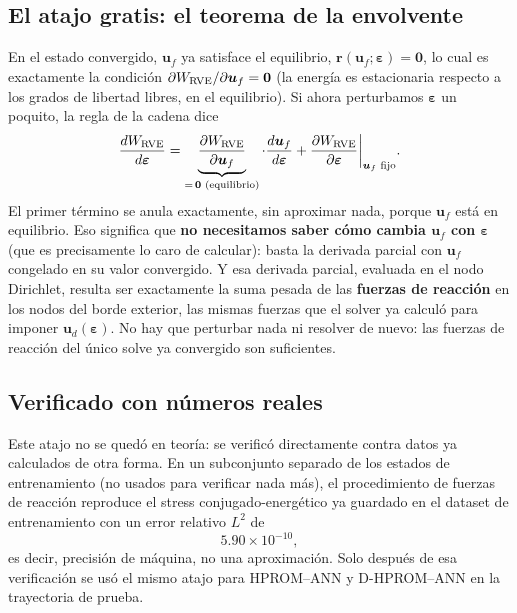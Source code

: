 \documentclass[11pt,a4paper]{article}
\begin{document}
\subsection{El atajo gratis: el teorema de la envolvente}

En el estado convergido, $\bm u_f$ ya satisface el equilibrio,
$\bm r(\bm u_f;\bm\varepsilon)=\bm 0$, lo cual es exactamente la
condici\'on $\partial W_{\rm RVE}/\partial \bm u_f=\bm 0$ (la energ\'ia
es estacionaria respecto a los grados de libertad libres, en el
equilibrio). Si ahora perturbamos $\bm\varepsilon$ un poquito, la
regla de la cadena dice
\begin{equation}
 \frac{dW_{\rm RVE}}{d\bm\varepsilon}
 = \underbrace{\frac{\partial W_{\rm RVE}}{\partial \bm u_f}}_{=\,\bm 0\text{ (equilibrio)}}\cdot\frac{d\bm u_f}{d\bm\varepsilon}
 + \frac{\partial W_{\rm RVE}}{\partial\bm\varepsilon}\bigg|_{\bm u_f\text{ fijo}}.
\end{equation}
El primer t\'ermino se anula exactamente, sin aproximar nada, porque
$\bm u_f$ est\'a en equilibrio. Eso significa que \textbf{no
necesitamos saber c\'omo cambia $\bm u_f$ con $\bm\varepsilon$} (que es
precisamente lo caro de calcular): basta la derivada parcial con
$\bm u_f$ congelado en su valor convergido. Y esa derivada parcial,
evaluada en el nodo Dirichlet, resulta ser exactamente la suma pesada
de las \textbf{fuerzas de reacci\'on} en los nodos del borde exterior,
las mismas fuerzas que el solver ya calcul\'o para imponer
$\bm u_d(\bm\varepsilon)$. No hay que perturbar nada ni resolver de
nuevo: las fuerzas de reacci\'on del \'unico solve ya convergido son
suficientes.

\subsection{Verificado con n\'umeros reales}

Este atajo no se qued\'o en teor\'ia: se verific\'o directamente contra
datos ya calculados de otra forma. En un subconjunto separado de los
estados de entrenamiento (no usados para verificar nada m\'as), el
procedimiento de fuerzas de reacci\'on reproduce el stress
conjugado-energ\'etico ya guardado en el dataset de entrenamiento con
un error relativo $L^2$ de
\begin{equation}
 5.90\times10^{-10},
\end{equation}
es decir, precisi\'on de m\'aquina, no una aproximaci\'on. Solo despu\'es
de esa verificaci\'on se us\'o el mismo atajo para HPROM--ANN y
D-HPROM--ANN en la trayectoria de prueba.
\end{document}
